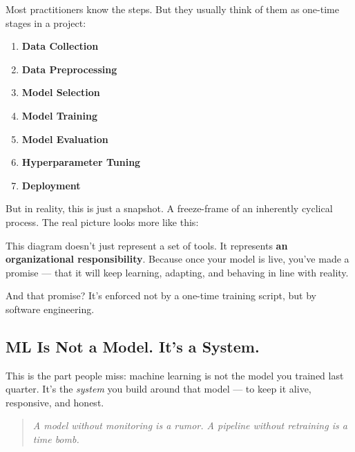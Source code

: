 Most practitioners know the steps. But they usually think of them as one-time stages in a project:

\begin{enumerate}
    \item \textbf{Data Collection}
    \item \textbf{Data Preprocessing}
    \item \textbf{Model Selection}
    \item \textbf{Model Training}
    \item \textbf{Model Evaluation}
    \item \textbf{Hyperparameter Tuning}
    \item \textbf{Deployment}
\end{enumerate}

But in reality, this is just a snapshot. A freeze-frame of an inherently cyclical process. The real picture looks more like this:

\begin{center}
\end{center}

This diagram doesn’t just represent a set of tools. It represents \textbf{an organizational responsibility}. Because once your model is live, you’ve made a promise — that it will keep learning, adapting, and behaving in line with reality.

And that promise? It’s enforced not by a one-time training script, but by software engineering.

\subsection{ML Is Not a Model. It's a System.}

This is the part people miss: machine learning is not the model you trained last quarter. It’s the \textit{system} you build around that model — to keep it alive, responsive, and honest.

\begin{quote}
\textit{A model without monitoring is a rumor. A pipeline without retraining is a time bomb.}
\end{quote}

